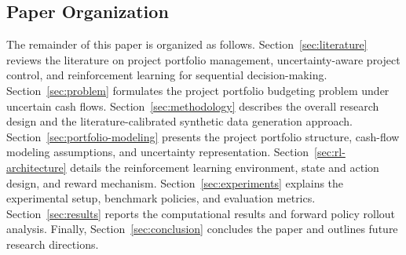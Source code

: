 \subsection{Paper Organization}

The remainder of this paper is organized as follows. Section~\ref{sec:literature} reviews the literature on project portfolio management, uncertainty-aware project control, and reinforcement learning for sequential decision-making. Section~\ref{sec:problem} formulates the project portfolio budgeting problem under uncertain cash flows. Section~\ref{sec:methodology} describes the overall research design and the literature-calibrated synthetic data generation approach. Section~\ref{sec:portfolio-modeling} presents the project portfolio structure, cash-flow modeling assumptions, and uncertainty representation. Section~\ref{sec:rl-architecture} details the reinforcement learning environment, state and action design, and reward mechanism. Section~\ref{sec:experiments} explains the experimental setup, benchmark policies, and evaluation metrics. Section~\ref{sec:results} reports the computational results and forward policy rollout analysis. Finally, Section~\ref{sec:conclusion} concludes the paper and outlines future research directions.
